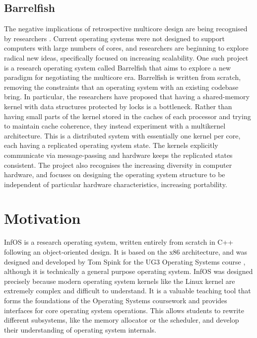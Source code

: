 \documentclass[bsc,frontabs,singlespacing,parskip,deptreport]{infthesis}
\begin{document}
\subsection{Barrelfish}
The negative implications of retrospective multicore design are being recognised by researchers \cite{barrelfish-article}. Current operating systems were not designed to support computers with large numbers of cores, and researchers are beginning to explore radical new ideas, specifically focused on increasing scalability. One such project is a research operating system called Barrelfish \cite{barrelfish-website} that aims to explore a new paradigm for negotiating the multicore era. Barrelfish is written from scratch, removing the constraints that an operating system with an existing codebase bring. In particular, the researchers have proposed that having a shared-memory kernel with data structures protected by locks is a bottleneck. Rather than having small parts of the kernel stored in the caches of each processor and trying to maintain cache coherence, they instead experiment with a multikernel architecture. This is a distributed system with essentially one kernel per core, each having a replicated operating system state. The kernels explicitly communicate via message-passing and hardware keeps the replicated states consistent. The project also recognises the increasing diversity in computer hardware, and focuses on designing the operating system structure to be independent of particular hardware characteristics, increasing portability. 

\section{Motivation} \label{motivation}
InfOS \cite{infos} is a research operating system, written entirely from scratch in C++ following an object-oriented design. It is based on the x86 architecture, and was designed and developed by Tom Spink for the UG3 Operating Systems course \cite{ug3os}, although it is technically a general purpose operating system. InfOS was designed precisely because modern operating system kernels like the Linux kernel are extremely complex and difficult to understand. It is a valuable teaching tool that forms the foundations of the Operating Systems coursework and provides interfaces for core operating system operations. This allows students to rewrite different subsystems, like the memory allocator or the scheduler, and develop their understanding of operating system internals. 
\end{document}
